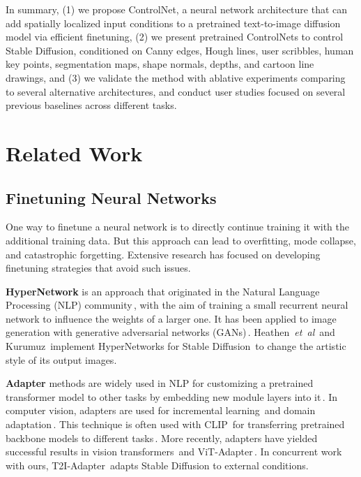 	In summary, (1) we propose ControlNet, a neural network architecture that can add spatially localized input conditions to a pretrained text-to-image diffusion model via efficient finetuning, (2) we present pretrained ControlNets to control Stable Diffusion, conditioned on Canny edges, Hough lines, user scribbles, human key points, segmentation maps, shape normals, depths, and cartoon line drawings, and (3) we validate the method with ablative experiments comparing to several alternative architectures, and conduct user studies focused on several previous baselines across different tasks.

	\section{Related Work}
	\label{sec:related}

	\subsection{Finetuning Neural Networks}

	 One way to finetune a neural network is to directly continue training it with the additional training data. But this approach can lead to overfitting, mode collapse, and catastrophic forgetting.  Extensive research has focused on developing finetuning strategies that avoid such issues.

	\textbf{HyperNetwork} is an approach that originated in the Natural Language Processing (NLP) community\,\cite{ha2017hypernetworks}, with the aim of training a small recurrent neural network to influence the weights of a larger one.  It has been applied to image generation with generative adversarial networks (GANs)\,\cite{alaluf2022hyperstyle,
		dinh2022hyperinverter}.  Heathen~\emph{et~al}\onedot\,\cite{heathen} and Kurumuz\,\cite{nai} implement HyperNetworks for Stable Diffusion\,\cite{rombach2021highresolution}
	to change the artistic style of its output images.

	\textbf{Adapter} methods are widely used in NLP for customizing a pretrained transformer model to other tasks by embedding new module layers into it\,\cite{houlsby2019parameter,stickland2019bert}.  In computer vision, adapters are used for incremental
	learning\,\cite{rosenfeld2018incremental} and domain
	adaptation\,\cite{rebuffi2018efficient}.  This technique is often used with CLIP\,\cite{radford2021learning} for transferring pretrained backbone models to different
	tasks\,\cite{gao2021clip,radford2021learning,sung2021vl,zhang2021tip}.
	More recently, adapters have yielded successful results in vision
	transformers\,\cite{li2022exploring,li2021benchmarking} and
	ViT-Adapter\,\cite{chen2022vision}.  In concurrent work with ours,
	T2I-Adapter\,\cite{mou2023t2i} adapts Stable Diffusion to external conditions. 

